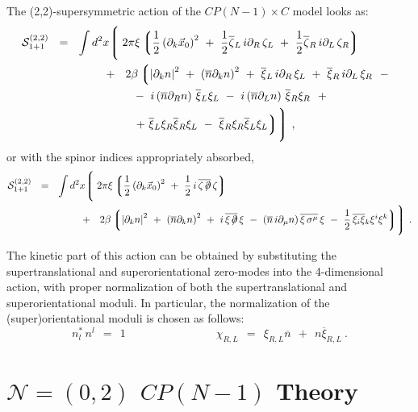 \documentclass{article}
\newcommand{\p}{\partial}
\newcommand{\ov}{\overline}
\newcommand{\mc}[1]{\mathcal{#1}}
\newcommand{\lgr}{\left\lgroup}
\newcommand{\rgr}{\right\rgroup}
\def\slashed#1{\setbox0=\hbox{$#1$}             %
   \dimen0=\wd0                                 %
   \setbox1=\hbox{/} \dimen1=\wd1               %
   \ifdim\dimen0>\dimen1                        %
      \rlap{\hbox to \dimen0{\hfil/\hfil}}      %
      #1                                        %
   \else                                        %
      \rlap{\hbox to \dimen1{\hfil$#1$\hfil}}   %
      /                                         %
   \fi}                                        %
\newcommand{\bxir}{\ov{\xi}{}_R}
\newcommand{\bxil}{\ov{\xi}{}_L}
\newcommand{\xir}{\xi_R}
\newcommand{\xil}{\xi_L}
\newcommand{\nbar}{\ov{n}}
\begin{document}
\pagebreak
	The (2,2)-supersymmetric action of the $CP(N-1) \times C$ model looks as:
\begin{align*}
%
\mc{S}_{\rm 1+1}^{\rm (2,2)}  ~~=~~ 
	\int  d^2x
	\Biggl\lgroup\; 
	&
		2\pi\xi \lgr   \frac{1}{2} \left(\p_k \vec{x}_0 \right)^2
				~+~  \frac{1}{2} \ov{\zeta}{}_L\, i\p_R\, \zeta_L 
				~+~  \frac{1}{2} \ov{\zeta}{}_R\, i\p_L\, \zeta_R
			\rgr
	\\
%
	~~+~~  
	&\;
	2\beta \lgr \left|\p_k n \right|^2  ~+~ \left(\ov{n}\p_k n\right)^2  
		~+~ \ov{\xi}{}_L\, i\p_R\, \xi_L  ~+~ \ov{\xi}{}_R\, i\p_L\,  \xi_R 
	~~-~~
		\right . \\
%
	&\;
	~~-~
	i \left(\nbar\p_R n\right)\, \bxil\xil ~-~ i \left(\nbar\p_Ln\right) \, \bxir\xir 
	~~+~~
	\\
%
	&\;
	\left .
		~~+~
		\bxil \xir \bxir \xil ~-~ \bxir \xir \bxil \xil
	 \rgr
	\Biggr\rgroup ~,
\end{align*}
	or with the spinor indices appropriately absorbed,
\begin{align*}
%
\mc{S}_{\rm 1+1}^{\rm (2,2)}  ~~=~~ 
	\int  d^2x
	\Biggl\lgroup\; 
	&
		2\pi\xi \lgr \frac{1}{2} \left(\p_k \vec{x}_0 \right)^2
				~+~ \frac{1}{2} \, i\, \ov{\zeta\,\slashed{\p}} \, \zeta
			\rgr \\
	~~+~~  
	&\;
	2\beta \lgr \left|\p_k n \right|^2  ~+~ \left(\ov{n}\p_k n\right)^2  
	~+~ i\,\ov{\xi\,\slashed{\p}}\,\xi ~-~ 
		\left(\ov{n}\,i\p_\mu n\right) \ov{\xi\,\sigma^\mu}\,\xi 
	~-~ \frac{1}{2}\, \ov{\xi_i \xi}{}_k \xi^i \xi^k 
	\rgr
	\Biggr\rgroup~.
\end{align*}

	The kinetic part of this action can be obtained by substituting the supertranslational and
	superorientational zero-modes into the 4-dimensional action, with proper normalization
	of both the supertranslational and superorientational moduli.
	In particular, the normalization of the (super)orientational moduli is chosen as follows:
\[
	n^{*}_l \, n^l ~~=~~ 1 \qquad\qquad\qquad\qquad \chi_{R,L} ~~=~~ \xi_{R,L} \nbar ~~+~~ n \ov{\xi}_{R,L}~.
\]


\pagebreak

\section{$\mc{N}=(0,2)$ $ CP(N-1) $  Theory}
\end{document}
